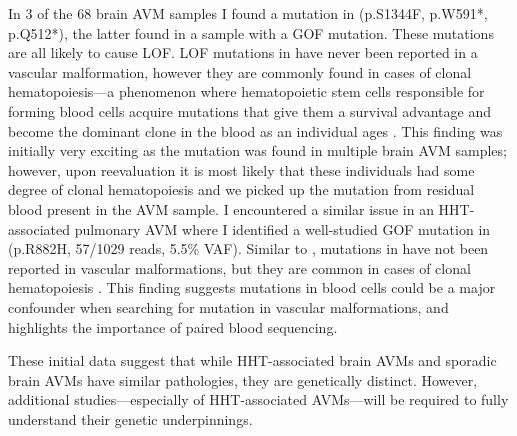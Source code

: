 In 3 of the 68 brain AVM samples I found a mutation in  (p.S1344F, p.W591*, p.Q512*), the latter found in a sample with a GOF  mutation. These mutations are all likely to cause LOF. LOF mutations in  have never been reported in a vascular malformation, however they are commonly found in cases of clonal hematopoiesis---a phenomenon where hematopoietic stem cells responsible for forming blood cells acquire mutations that give them a survival advantage and become the dominant clone in the blood as an individual ages \citep{fujino2020}. This finding was initially very exciting as the mutation was found in multiple brain AVM samples; however, upon reevaluation it is most likely that these individuals had some degree of clonal hematopoiesis and we picked up the  mutation from residual blood present in the AVM sample. I encountered a similar issue in an HHT-associated pulmonary AVM where I identified a well-studied GOF mutation in  (p.R882H, 57/1029 reads, 5.5\% VAF). Similar to , mutations in  have not been reported in vascular malformations, but they are common in cases of clonal hematopoiesis \citep{buscarlet2017}. This finding suggests mutations in blood cells could be a major confounder when searching for mutation in vascular malformations, and highlights the importance of paired blood sequencing.

These initial data suggest that while HHT-associated brain AVMs and sporadic brain AVMs have similar pathologies, they are genetically distinct. However, additional studies---especially of HHT-associated AVMs---will be required to fully understand their genetic underpinnings. 







